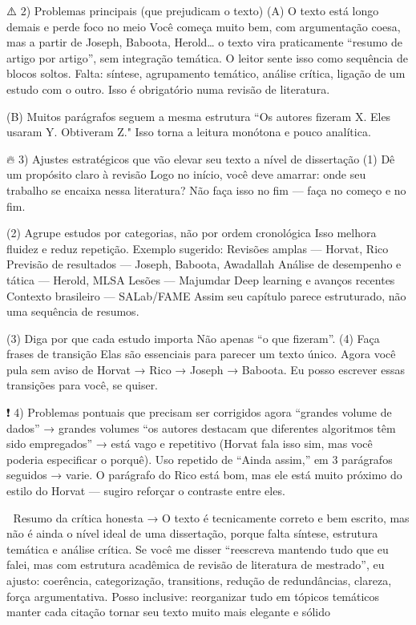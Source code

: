 ⚠️ 2) Problemas principais (que prejudicam o texto)
(A) O texto está longo demais e perde foco no meio
Você começa muito bem, com argumentação coesa, mas a partir de Joseph, Baboota, Herold… o texto vira praticamente “resumo de artigo por artigo”, sem integração temática.
O leitor sente isso como sequência de blocos soltos.
Falta:
síntese,
agrupamento temático,
análise crítica,
ligação de um estudo com o outro.
Isso é obrigatório numa revisão de literatura.

(B) Muitos parágrafos seguem a mesma estrutura
“Os autores fizeram X. Eles usaram Y. Obtiveram Z."
Isso torna a leitura monótona e pouco analítica.


🔥 3) Ajustes estratégicos que vão elevar seu texto a nível de dissertação
(1) Dê um propósito claro à revisão
Logo no início, você deve amarrar:
onde seu trabalho se encaixa nessa literatura?
Não faça isso no fim — faça no começo e no fim.

(2) Agrupe estudos por categorias, não por ordem cronológica
Isso melhora fluidez e reduz repetição.
Exemplo sugerido:
Revisões amplas — Horvat, Rico
Previsão de resultados — Joseph, Baboota, Awadallah
Análise de desempenho e tática — Herold, MLSA
Lesões — Majumdar
Deep learning e avanços recentes
Contexto brasileiro — SALab/FAME
Assim seu capítulo parece estruturado, não uma sequência de resumos.

(3) Diga por que cada estudo importa
Não apenas “o que fizeram”.
(4) Faça frases de transição
Elas são essenciais para parecer um texto único.
Agora você pula sem aviso de Horvat → Rico → Joseph → Baboota.
Eu posso escrever essas transições para você, se quiser.

❗ 4) Problemas pontuais que precisam ser corrigidos agora
“grandes volume de dados” → grandes volumes
“os autores destacam que diferentes algoritmos têm sido empregados” → está vago e repetitivo (Horvat fala isso sim, mas você poderia especificar o porquê).
Uso repetido de “Ainda assim,” em 3 parágrafos seguidos → varie.
O parágrafo do Rico está bom, mas ele está muito próximo do estilo do Horvat — sugiro reforçar o contraste entre eles.

🧠 Resumo da crítica honesta
→ O texto é tecnicamente correto e bem escrito, mas não é ainda o nível ideal de uma dissertação, porque falta síntese, estrutura temática e análise crítica.
Se você me disser “reescreva mantendo tudo que eu falei, mas com estrutura acadêmica de revisão de literatura de mestrado”, eu ajusto:
coerência,
categorização,
transitions,
redução de redundâncias,
clareza,
força argumentativa.
Posso inclusive:
reorganizar tudo em tópicos temáticos
manter cada citação
tornar seu texto muito mais elegante e sólido